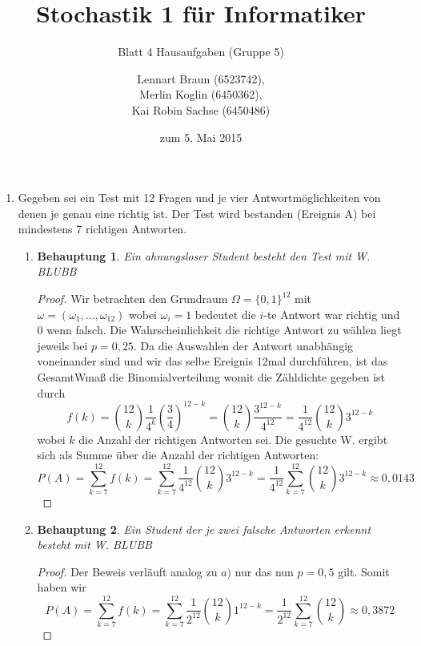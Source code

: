 \documentclass[a4paper]{scrartcl}
\title{Stochastik 1 für Informatiker}
\subtitle{Blatt 4 Hausaufgaben (Gruppe 5)}
\author{
    Lennart Braun (6523742), \\
    Merlin Koglin (6450362), \\
    Kai Robin Sachse (6450486)
}
\date{zum 5. Mai 2015}
\newtheorem*{behaupt}{Behauptung}
\begin{document}
\maketitle

\begin{enumerate}[label=\bfseries\arabic*.]
    \item
        Gegeben sei ein Test mit 12 Fragen und je vier Antwortmöglichkeiten von denen
        je genau eine richtig ist. Der Test wird bestanden (Ereignis A) bei mindestens
        7 richtigen Antworten.
        \begin{enumerate}[label=(\alph*)]
            \item
                \begin{behaupt}
                    Ein ahnungsloser Student besteht den Test mit W. BLUBB
                \end{behaupt}
                \begin{proof}
                    Wir betrachten den Grundraum $\Omega=\{0,1\}^12$ mit
                    $\omega=(\omega_1,\ldots,\omega_12)$ wobei $\omega_i=1$ bedeutet die $i$-te
                    Antwort war richtig und 0 wenn falsch. Die Wahrscheinlichkeit die richtige
                    Antwort zu wählen liegt jeweils bei $p=0,25$. Da die Auswahlen der Antwort
                    unabhängig voneinander sind und wir das selbe Ereignis 12mal durchführen,
                    ist das GesamtWmaß die Binomialverteilung womit die Zähldichte gegeben ist durch
                    \[f(k)=\binom{12}{k} \frac{1}{4^k}\left(\frac{3}{4}\right)^{12-k} = 
                    \binom{12}{k} \frac{3^{12-k}}{4^{12}}= \frac{1}{4^{12}}\binom{12}{k} 3^{12-k}\]
                    wobei $k$ die Anzahl der richtigen Antworten sei. Die gesuchte W. ergibt sich als
                    Summe über die Anzahl der richtigen Antworten:
                    \[P(A)=\sum_{k=7}^{12}f(k)=\sum_{k=7}^{12} \frac{1}{4^{12}}\binom{12}{k} 3^{12-k}=
                     \frac{1}{4^{12}}\sum_{k=7}^{12}\binom{12}{k} 3^{12-k}\approx 0,0143\]
                    
                \end{proof}

            \item
                \begin{behaupt}
                    Ein Student der je zwei falsche Antworten erkennt besteht mit W. BLUBB
                \end{behaupt}
                \begin{proof}
                    Der Beweis verläuft analog zu $a)$ nur das nun $p=0,5$ gilt. Somit haben wir
                    \[P(A)=\sum_{k=7}^{12}f(k)=\sum_{k=7}^{12} \frac{1}{2^{12}}\binom{12}{k} 1^{12-k}=
                     \frac{1}{2^{12}}\sum_{k=7}^{12}\binom{12}{k} \approx 0,3872\]
                \end{proof}


\end{enumerate}
\end{enumerate}
\end{document}
